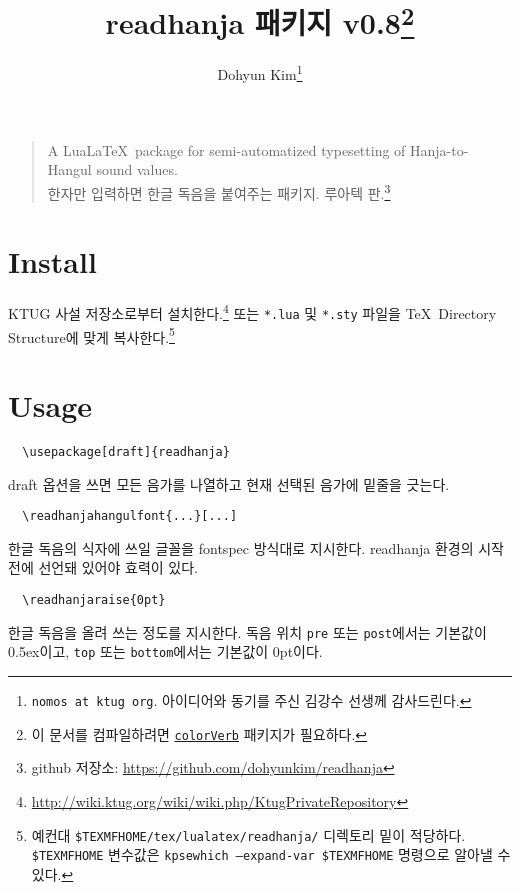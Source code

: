 \documentclass[a4paper,11pt]{article}
\begin{document}
\title{\ttfamily readhanja 패키지 v0.8\thanks{이 문서를 컴파일하려면
    \href{https://gist.github.com/dohyunkim/5f2dc71b1ff85adb3978}{\texttt{colorVerb}}
    패키지가 필요하다.
}}
\author{Dohyun Kim\thanks{\texttt{nomos at ktug org}.
  아이디어와 동기를 주신 김강수 선생께 감사드린다.}}
\maketitle

\begin{quote}
A Lua\LaTeX\ package for semi-automatized typesetting of
Hanja-to-Hangul sound values.\\
한자만 입력하면 한글 독음을 붙여주는 패키지. 루아텍 판.\footnote{
  github 저장소: \url{https://github.com/dohyunkim/readhanja}}
\end{quote}

\section*{Install}

KTUG 사설 저장소로부터 설치한다.\footnote{
  \url{http://wiki.ktug.org/wiki/wiki.php/KtugPrivateRepository}}
또는
\verb|*.lua| 및 \verb|*.sty| 파일을 \TeX\ Directory Structure에 맞게 복사한다.\footnote{
  예컨대 \texttt{\$TEXMFHOME/tex/lualatex/readhanja/} 디렉토리 밑이 적당하다.
  \texttt{\$TEXMFHOME} 변수값은 \texttt{kpsewhich --expand-var \string\$TEXMFHOME}
  명령으로 알아낼 수 있다.
}

\section*{Usage}

\begin{verbatim}
  \usepackage[draft]{readhanja}
\end{verbatim}
draft 옵션을 쓰면 모든 음가를 나열하고 현재 선택된 음가에
밑줄을 긋는다.

\begin{verbatim}
  \readhanjahangulfont{...}[...]
\end{verbatim}
한글 독음의 식자에 쓰일 글꼴을 fontspec 방식대로 지시한다.
readhanja 환경의 시작 전에 선언돼 있어야 효력이 있다.

\begin{verbatim}
  \readhanjaraise{0pt}
\end{verbatim}
한글 독음을 올려 쓰는 정도를 지시한다.
독음 위치 \verb|pre| 또는 \verb|post|에서는 기본값이 0.5ex이고,
\verb|top| 또는 \verb|bottom|에서는 기본값이 0pt이다.
\end{document}
